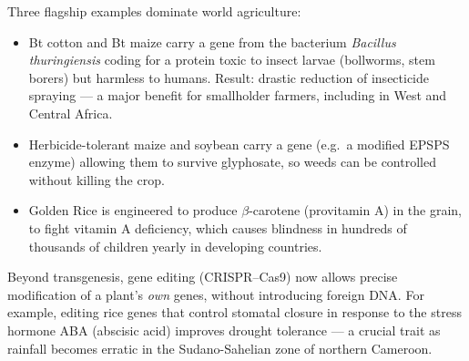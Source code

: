 \documentclass[11pt]{article}
\newcommand{\cle}[1]{{\popxbold\color{popdark}#1}}
\begin{document}
Three flagship examples dominate world agriculture:
\begin{itemize}
\item \cle{Bt cotton} and Bt maize carry a gene from the bacterium \emph{Bacillus thuringiensis} coding for a protein toxic to insect larvae (bollworms, stem borers) but harmless to humans. Result: drastic reduction of insecticide spraying --- a major benefit for smallholder farmers, including in West and Central Africa.
\item \cle{Herbicide-tolerant maize and soybean} carry a gene (e.g.\ a modified EPSPS enzyme) allowing them to survive glyphosate, so weeds can be controlled without killing the crop.
\item \cle{Golden Rice} is engineered to produce $\beta$-carotene (provitamin A) in the grain, to fight vitamin A deficiency, which causes blindness in hundreds of thousands of children yearly in developing countries.
\end{itemize}

Beyond transgenesis, \cle{gene editing} (CRISPR--Cas9) now allows precise modification of a plant's \emph{own} genes, without introducing foreign DNA. For example, editing rice genes that control stomatal closure in response to the stress hormone ABA (abscisic acid) improves \cle{drought tolerance} --- a crucial trait as rainfall becomes erratic in the Sudano-Sahelian zone of northern Cameroon.
\end{document}

